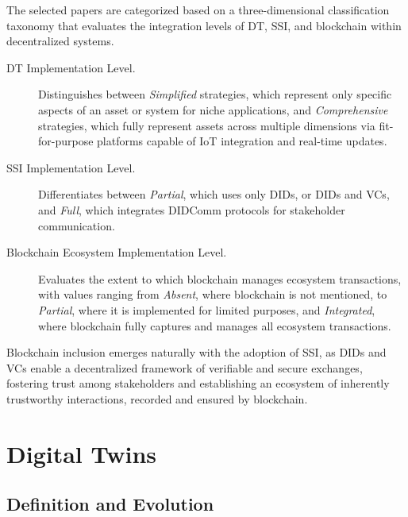 The selected papers are categorized based on a three-dimensional classification taxonomy that evaluates the integration levels of \ac{DT}, \ac{SSI}, and blockchain within decentralized systems.

\begin{description}
    \item[\ac{DT} Implementation Level.] Distinguishes between \emph{Simplified} strategies, which represent only specific aspects of an asset or system for niche applications, and \emph{Comprehensive} strategies, which fully represent assets across multiple dimensions via fit-for-purpose platforms capable of \ac{IoT} integration and real-time updates.

    \item[\ac{SSI} Implementation Level.] Differentiates between \emph{Partial}, which uses only \acp{DID}, or \acp{DID} and \acp{VC}, and \emph{Full}, which integrates \ac{DIDComm} protocols for stakeholder communication.

    \item[Blockchain Ecosystem Implementation Level.] Evaluates the extent to which blockchain manages ecosystem transactions, with values ranging from \emph{Absent}, where blockchain is not mentioned, to \emph{Partial}, where it is implemented for limited purposes, and \emph{Integrated}, where blockchain fully captures and manages all ecosystem transactions.
\end{description}

Blockchain inclusion emerges naturally with the adoption of \ac{SSI}, as \acp{DID} and \acp{VC} enable a decentralized framework of verifiable and secure exchanges, fostering trust among stakeholders and establishing an ecosystem of inherently trustworthy interactions, recorded and ensured by blockchain.

\section{Digital Twins}
\label{sec:digital-twins}

\subsection{Definition and Evolution}
\label{subsec:dt-definition}

